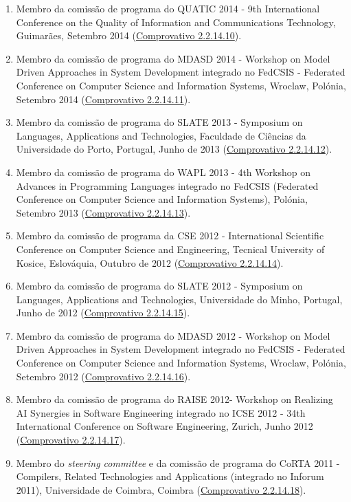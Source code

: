 \documentclass[11pt]{article}
\begin{document}
\begin{enumerate}
\item {Membro da comissão de programa do QUATIC 2014 - 9th International Conference on the Quality of Information and Communications Technology, Guimarães, Setembro 2014 (\href{run:ComprovativosCOCP/CPQuatic2014.pdf}{Comprovativo 2.2.14.10}).}
\item {Membro da comissão de programa do MDASD 2014 - Workshop on Model Driven Approaches in System Development integrado no FedCSIS - Federated Conference on Computer Science and Information Systems, Wroclaw, Polónia, Setembro 2014 (\href{run:ComprovativosCOCP/CPMDASD2014.pdf}{Comprovativo 2.2.14.11}).}
\item {Membro da comissão de programa do SLATE 2013 - Symposium on Languages, Applications and Technologies, Faculdade de Ciências da Universidade do Porto, Portugal, Junho de 2013 (\href{run:ComprovativosCOCP/CPSLATE2013.pdf}{Comprovativo 2.2.14.12}).}
\item {Membro da comissão de programa do WAPL 2013 - 4th Workshop on Advances in Programming Languages integrado no FedCSIS (Federated Conference on Computer Science and Information Systems), Polónia, Setembro 2013 (\href{run:ComprovativosCOCP/CPWAPL2013.pdf}{Comprovativo 2.2.14.13}).}
\item {Membro da comissão de programa da CSE 2012 - International Scientific Conference on Computer Science and Engineering, Tecnical University of Kosice, Eslováquia, Outubro de 2012 (\href{run:ComprovativosCOCP/CPCSE2012.pdf}{Comprovativo 2.2.14.14}).}
\item {Membro da comissão de programa do SLATE 2012 - Symposium on Languages, Applications and Technologies, Universidade do Minho, Portugal, Junho de 2012 (\href{run:ComprovativosCOCP/CPSLATE2012.pdf}{Comprovativo 2.2.14.15}).}
\item {Membro da comissão de programa  do MDASD 2012 - Workshop on Model Driven Approaches in System Development integrado no FedCSIS - Federated Conference on Computer Science and Information Systems, Wroclaw, Polónia, Setembro 2012 (\href{run:ComprovativosCOCP/CPMDASD2012.pdf}{Comprovativo 2.2.14.16}).}
\item {Membro da comissão de programa do RAISE 2012- Workshop on Realizing AI Synergies in Software Engineering integrado no ICSE 2012 - 34th International Conference on Software Engineering, Zurich, Junho 2012 (\href{run:ComprovativosCOCP/COCPRAISE2012.pdf}{Comprovativo 2.2.14.17}).}
\item {Membro do \emph{steering committee} e da comissão de programa do CoRTA 2011 - Compilers, Related Technologies and Applications (integrado no Inforum 2011), Universidade de Coimbra, Coimbra (\href{run:ComprovativosCOCP/CPCoRTA2011.pdf}{Comprovativo 2.2.14.18}).}

\end{enumerate}
\end{document}
